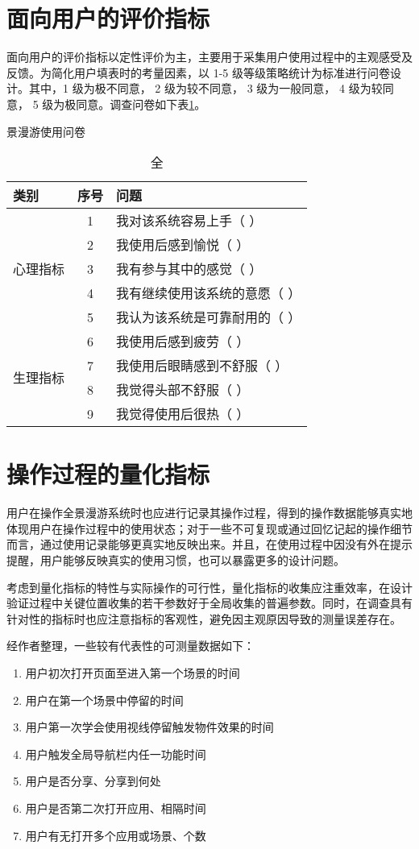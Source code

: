 \section{面向用户的评价指标}
面向用户的评价指标以定性评价为主，主要用于采集用户使用过程中的主观感受及反馈。为简化用户填表时的考量因素，以 1-5 级等级策略统计为标准进行问卷设计。其中，1 级为极不同意， 2 级为较不同意， 3 级为一般同意， 4 级为较同意， 5 级为极同意。调查问卷如下表\ref{tab:questionnaire}。

\begin{table}[htp]
\centering
\caption 全景漫游使用问卷
\vskip 5pt
\begin{tabular}{lcl}
\toprule
类别 & 序号 & 问题 \\
\midrule
\multirow{5}{*}{心理指标} & 1 & 我对该系统容易上手（ ） \\
& 2 & 我使用后感到愉悦（ ） \\
& 3 & 我有参与其中的感觉（ ） \\
& 4 & 我有继续使用该系统的意愿（ ） \\
& 5 & 我认为该系统是可靠耐用的（ ） \\
\midrule
\multirow{4}{*}{生理指标} & 6 & 我使用后感到疲劳（ ） \\
& 7 & 我使用后眼睛感到不舒服（ ） \\
& 8 & 我觉得头部不舒服（ ） \\
& 9 & 我觉得使用后很热（ ） \\
\bottomrule
\end{tabular}
\label{tab:questionnaire}
\end{table}

\section{操作过程的量化指标}

用户在操作全景漫游系统时也应进行记录其操作过程，得到的操作数据能够真实地体现用户在操作过程中的使用状态；对于一些不可复现或通过回忆记起的操作细节而言，通过使用记录能够更真实地反映出来。并且，在使用过程中因没有外在提示提醒，用户能够反映真实的使用习惯，也可以暴露更多的设计问题。

考虑到量化指标的特性与实际操作的可行性，量化指标的收集应注重效率，在设计验证过程中关键位置收集的若干参数好于全局收集的普遍参数。同时，在调查具有针对性的指标时也应注意指标的客观性，避免因主观原因导致的测量误差存在。

经作者整理，一些较有代表性的可测量数据如下：
\begin{enumerate}
	\item 用户初次打开页面至进入第一个场景的时间
	\item 用户在第一个场景中停留的时间
	\item 用户第一次学会使用视线停留触发物件效果的时间
	\item 用户触发全局导航栏内任一功能时间
	\item 用户是否分享、分享到何处
    \item 用户是否第二次打开应用、相隔时间
    \item 用户有无打开多个应用或场景、个数
\end{enumerate}

